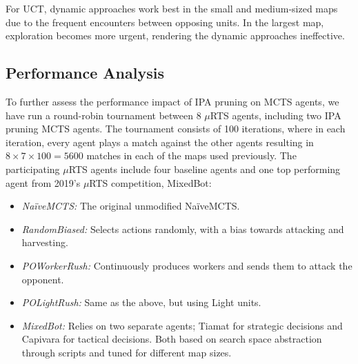 \documentclass[conference]{IEEEtran}
\newcommand{\mRTS}{$\mu$RTS}
\begin{document}
\begin{table}[!h]
\renewcommand{\arraystretch}{1.3}
\caption{Best Performing Pruning Approaches}
\label{bestApproaches}
\centering
{}
\end{table}

For UCT, dynamic approaches work best in the small and medium-sized maps due to the frequent encounters between opposing units. In the largest map, exploration becomes more urgent, rendering the dynamic approaches ineffective.


\subsection{Performance Analysis}

To further assess the performance impact of IPA pruning on MCTS agents, we have run a round-robin tournament between 8 \mRTS{} agents, including two IPA pruning MCTS agents. The tournament consists of 100 iterations, where in each iteration, every agent plays a match against the other agents resulting in $8\times7\times100 = 5600$ matches in each of the maps used previously. The participating \mRTS{} agents include four baseline agents and one top performing agent from 2019's \mRTS{} competition, MixedBot: %

\begin{itemize}
\item \textit{NaïveMCTS:} The original unmodified NaïveMCTS.
\item \textit{RandomBiased:} Selects actions randomly, with a bias towards attacking and harvesting.
\item \textit{POWorkerRush:} Continuously produces workers and sends them to attack the opponent.
\item \textit{POLightRush:} Same as the above, but using Light units.
\item \textit{MixedBot:} Relies on two separate agents; Tiamat\cite{marino_evolving_2018} for strategic decisions and Capivara\cite{moraes_action_2018} for tactical decisions. Both based on search space abstraction through scripts and tuned for different map sizes.
\end{itemize}
\end{document}
